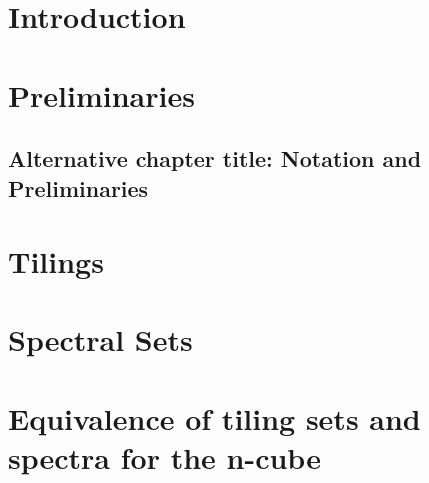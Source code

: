 \documentclass[british, oneside]{ntnuthesis}
\begin{document}
    



    \chapter{Introduction}
        

    \chapter{Preliminaries}
    \section*{Alternative chapter title: Notation and Preliminaries}
        
    
    \chapter{Tilings}
        

    \chapter{Spectral Sets}
        
    
    \chapter{Equivalence of tiling sets and spectra for the n-cube}\label{chap:equivalence}
        


    \printbibliography
\end{document}
